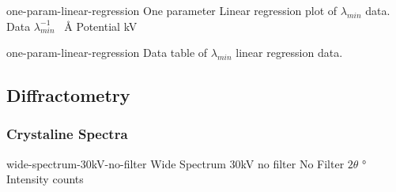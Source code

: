 \documentclass{WitsPhysicsReport}
\begin{document}
\lipsum[14]

                                 {one-param-linear-regression} %
                                 {One parameter Linear regression plot of $\lambda_{min}$ data.} %
                                 {Data} %
                                 {$\lambda^{-1}_{min}$} %
                                 {\si{\per\angstrom}} %
                                 {Potential} %
                                 {\si{\kilo\volt}} %

\lipsum[15]

                       {one-param-linear-regression} %
                       {Data table of $ \lambda_{min} $ linear regression data.} %

\lipsum[16]

\subsection{Diffractometry}
\label{subsec:Diffractometry}

\lipsum[17]

\lipsum[18]

\subsubsection{Crystaline Spectra}
\label{subsubsec:Crystaline_Spectra}

\lipsum[19]

                 {wide-spectrum-30kV-no-filter} %
                 {Wide Spectrum 30kV no filter} %
                 {No Filter} %
                 {$2 \theta$} %
                 {\si{\degree}} %
                 {Intensity} %
                 {counts} %
                 {%
                 }
\end{document}
